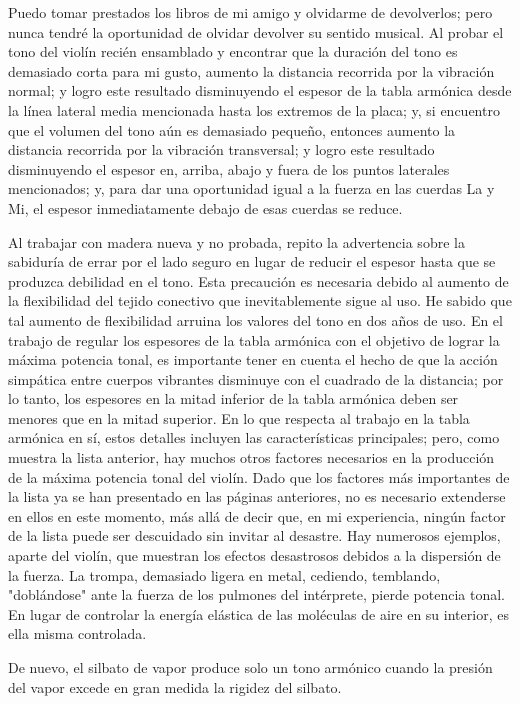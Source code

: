 \documentclass[12pt]{book}
\begin{document}
Puedo tomar prestados los libros de mi amigo y olvidarme de devolverlos; pero nunca tendré la oportunidad de olvidar devolver su sentido musical. Al probar el tono del violín recién ensamblado y encontrar que la duración del tono es demasiado corta para mi gusto, aumento la distancia recorrida por la vibración normal; y logro este resultado disminuyendo el espesor de la tabla armónica desde la línea lateral media mencionada hasta los extremos de la placa; y, si encuentro que el volumen del tono aún es demasiado pequeño, entonces aumento la distancia recorrida por la vibración transversal; y logro este resultado disminuyendo el espesor en, arriba, abajo y fuera de los puntos laterales mencionados; y, para dar una oportunidad igual a la fuerza en las cuerdas La y Mi, el espesor inmediatamente debajo de esas cuerdas se reduce.

Al trabajar con madera nueva y no probada, repito la advertencia sobre la sabiduría de errar por el lado seguro en lugar de reducir el espesor hasta que se produzca debilidad en el tono. Esta precaución es necesaria debido al aumento de la flexibilidad del tejido conectivo que inevitablemente sigue al uso. He sabido que tal aumento de flexibilidad arruina los valores del tono en dos años de uso. En el trabajo de regular los espesores de la tabla armónica con el objetivo de lograr la máxima potencia tonal, es importante tener en cuenta el hecho de que la acción simpática entre cuerpos vibrantes disminuye con el cuadrado de la distancia; por lo tanto, los espesores en la mitad inferior de la tabla armónica deben ser menores que en la mitad superior. En lo que respecta al trabajo en la tabla armónica en sí, estos detalles incluyen las características principales; pero, como muestra la lista anterior, hay muchos otros factores necesarios en la producción de la máxima potencia tonal del violín. Dado que los factores más importantes de la lista ya se han presentado en las páginas anteriores, no es necesario extenderse en ellos en este momento, más allá de decir que, en mi experiencia, ningún factor de la lista puede ser descuidado sin invitar al desastre. Hay numerosos ejemplos, aparte del violín, que muestran los efectos desastrosos debidos a la dispersión de la fuerza. La trompa, demasiado ligera en metal, cediendo, temblando, "doblándose" ante la fuerza de los pulmones del intérprete, pierde potencia tonal. En lugar de controlar la energía elástica de las moléculas de aire en su interior, es ella misma controlada.

De nuevo, el silbato de vapor produce solo un tono armónico cuando la presión del vapor excede en gran medida la rigidez del silbato.
\end{document}
